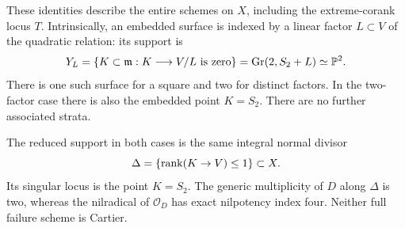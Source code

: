 \begin{theorem}
These identities describe the entire schemes on $X$, including the
extreme-corank locus $T$. Intrinsically, an embedded surface is indexed
by a linear factor $L\subset V$ of the quadratic relation: its support is
\begin{equation}\label{eq:loewy-factor-surface}
 Y_L=\{K\subset\mathfrak m:K\longrightarrow V/L\text{ is zero}\}
       =\operatorname{Gr}(2,S_2+L)\simeq\mathbb P^2.
\end{equation}
There is one such surface for a square and two for distinct factors.
In the two-factor case there is also the embedded point $K=S_2$.
There are no further associated strata.

The reduced support in both cases is the same integral normal divisor
\[
 \Delta=\{\operatorname{rank}(K\to V)\le1\}\subset X.
\]
Its singular locus is the point $K=S_2$. The generic multiplicity of
$D$ along $\Delta$ is two, whereas the nilradical of $\mathcal O_D$
has exact nilpotency index four. Neither full failure scheme is Cartier.
\end{theorem}
